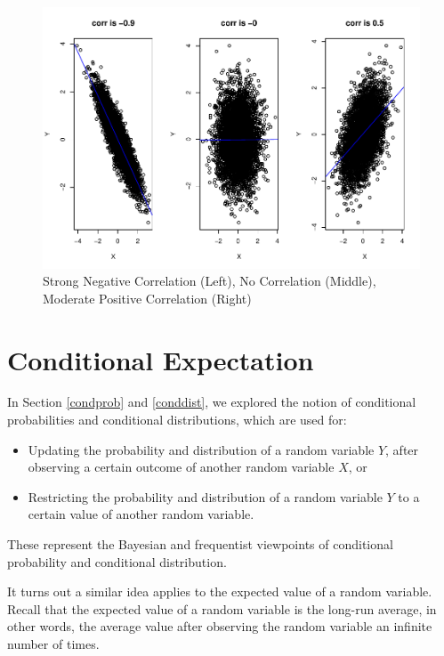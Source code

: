 \documentclass[
]{book}
\providecommand{\tightlist}{%
  \setlength{\itemsep}{0pt}\setlength{\parskip}{0pt}}
\begin{document}
\begin{figure}
\centering
\includegraphics{bookdown-demo_files/figure-latex/5-corrs-1.pdf}
\caption{\label{fig:5-corrs}Strong Negative Correlation (Left), No Correlation (Middle), Moderate Positive Correlation (Right)}
\end{figure}

\section{Conditional Expectation}\label{conditional-expectation}

In Section \ref{condprob} and \ref{conddist}, we explored the notion of conditional probabilities and conditional distributions, which are used for:

\begin{itemize}
\tightlist
\item
  Updating the probability and distribution of a random variable \(Y\), after observing a certain outcome of another random variable \(X\), or
\item
  Restricting the probability and distribution of a random variable \(Y\) to a certain value of another random variable.
\end{itemize}

These represent the Bayesian and frequentist viewpoints of conditional probability and conditional distribution.

It turns out a similar idea applies to the expected value of a random variable. Recall that the expected value of a random variable is the long-run average, in other words, the average value after observing the random variable an infinite number of times.
\end{document}
